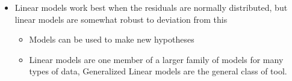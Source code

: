 \documentclass[
]{book}
\providecommand{\tightlist}{%
  \setlength{\itemsep}{0pt}\setlength{\parskip}{0pt}}
\newenvironment{roundup}
{ \begin{tcolorbox}[colbacktitle=yellow!50!white,
title=Round Up,coltitle=black,
fonttitle=\bfseries] }
{  \end{tcolorbox} }
\begin{document}
\begin{roundup}
\begin{itemize}
\tightlist
\item
  Linear models work best when the residuals are normally distributed, but linear models are somewhat robust to deviation from this

  \begin{itemize}
  \tightlist
  \item
    Models can be used to make new hypotheses
  \item
    Linear models are one member of a larger family of models for many types of data, Generalized Linear models are the general class of tool.
  \end{itemize}
\end{itemize}
\end{roundup}

  
\end{document}
